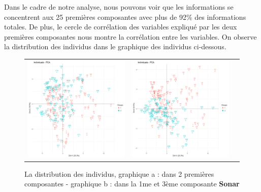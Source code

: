 \documentclass[a4paper,11pt,oneside,roman]{article}
\begin{document}
Dans le cadre de notre analyse, nous pouvons voir que les informations se concentrent aux 25 premières composantes avec plus de 92\% des informations totales. De plus, le cercle de corrélation des variables expliqué par les deux premières composantes nous montre la corrélation entre les variables. On observe la distribution des individus dans le graphique des individus ci-dessous. 
\begin{figure}[htb]
    \centering
    \begin{tabular}{ccc}
    \includegraphics[scale = .3]{./discrimination/Sonar/indi_plot12.png} &
    \includegraphics[scale = .3]{./discrimination/Sonar/indi_plot13.png} 
    \end{tabular}
    \caption{La distribution des individus, graphique a : dans 2 premières composantes - graphique b : dans la 1me et 3ème composante \textbf{Sonar}}
    \label{fig:my_label}
\end{figure}
\end{document}
